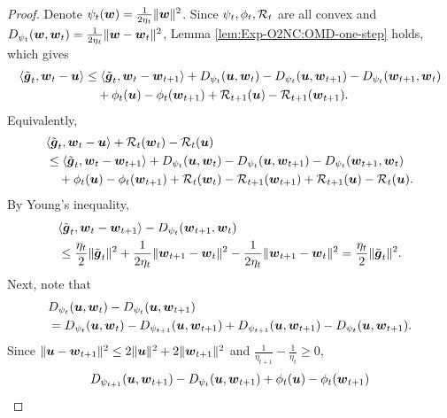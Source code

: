 \begin{proof}
Denote $\psi_t({\boldsymbol{w}})=\frac{1}{2\eta_t}\|{\boldsymbol{w}}\|^2$. Since $\psi_t,\phi_t,{\cal R}_t$ are all convex and $D_{\psi_t}({\boldsymbol{w}},{\boldsymbol{w}}_t) = \frac{1}{2\eta_t}\|{\boldsymbol{w}}-{\boldsymbol{w}}_t\|^2$, Lemma \ref{lem:Exp-O2NC:OMD-one-step} holds, which gives
\begin{align*}
    \langle \tilde{{\boldsymbol{g}}}_t, {\boldsymbol{w}}_t-{\boldsymbol{u}}\rangle 
    &\le \langle \tilde{{\boldsymbol{g}}}_t,{\boldsymbol{w}}_t - {\boldsymbol{w}}_{t+1}\rangle + D_{\psi_t}({\boldsymbol{u}},{\boldsymbol{w}}_t) - D_{\psi_t}({\boldsymbol{u}},{\boldsymbol{w}}_{t+1}) - D_{\psi_t}({\boldsymbol{w}}_{t+1},{\boldsymbol{w}}_t) \\
    &\quad + \phi_t({\boldsymbol{u}}) - \phi_t({\boldsymbol{w}}_{t+1}) + {\cal R}_{t+1}({\boldsymbol{u}}) - {\cal R}_{t+1}({\boldsymbol{w}}_{t+1}).
\end{align*}
Equivalently,
\begin{align}
    &\langle \tilde{{\boldsymbol{g}}}_t, {\boldsymbol{w}}_t-{\boldsymbol{u}}\rangle + {\cal R}_t({\boldsymbol{w}}_t) - {\cal R}_t({\boldsymbol{u}}) \notag\\
    &\le \langle \tilde{{\boldsymbol{g}}}_t,{\boldsymbol{w}}_t - {\boldsymbol{w}}_{t+1}\rangle + D_{\psi_t}({\boldsymbol{u}},{\boldsymbol{w}}_t) - D_{\psi_t}({\boldsymbol{u}},{\boldsymbol{w}}_{t+1}) - D_{\psi_t}({\boldsymbol{w}}_{t+1},{\boldsymbol{w}}_t) \notag\\
    &\quad + \phi_t({\boldsymbol{u}}) - \phi_t({\boldsymbol{w}}_{t+1}) + {\cal R}_t({\boldsymbol{w}}_t) - {\cal R}_{t+1}({\boldsymbol{w}}_{t+1}) + {\cal R}_{t+1}({\boldsymbol{u}}) - {\cal R}_t({\boldsymbol{u}}).
    \label{eq:Exp-O2NC:ogd-vary-1}
\end{align}
By Young's inequality,
\begin{align*}
    &\langle \tilde{{\boldsymbol{g}}}_t,{\boldsymbol{w}}_t - {\boldsymbol{w}}_{t+1}\rangle - D_{\psi_t}({\boldsymbol{w}}_{t+1},{\boldsymbol{w}}_t) \\
    &\le \frac{\eta_t}{2}\|\tilde{{\boldsymbol{g}}}_t\|^2 + \frac{1}{2\eta_t}\|{\boldsymbol{w}}_{t+1}-{\boldsymbol{w}}_t\|^2 - \frac{1}{2\eta_t}\|{\boldsymbol{w}}_{t+1}-{\boldsymbol{w}}_t\|^2 
    = \frac{\eta_t}{2}\|\tilde{{\boldsymbol{g}}}_t\|^2.
\end{align*}
Next, note that
\begin{align*}
    &D_{\psi_t}({\boldsymbol{u}},{\boldsymbol{w}}_t) - D_{\psi_t}({\boldsymbol{u}},{\boldsymbol{w}}_{t+1}) \\
    &= D_{\psi_t}({\boldsymbol{u}},{\boldsymbol{w}}_t) - D_{\psi_{t+1}}({\boldsymbol{u}},{\boldsymbol{w}}_{t+1}) + D_{\psi_{t+1}}({\boldsymbol{u}},{\boldsymbol{w}}_{t+1}) - D_{\psi_t}({\boldsymbol{u}},{\boldsymbol{w}}_{t+1}).
\end{align*}
Since $\|{\boldsymbol{u}}-{\boldsymbol{w}}_{t+1}\|^2 \le 2\|{\boldsymbol{u}}\|^2 + 2\|{\boldsymbol{w}}_{t+1}\|^2$ and $\frac{1}{\eta_{t+1}}-\frac{1}{\eta_t}\ge 0$,
\begin{align*}
    &D_{\psi_{t+1}}(\vecu,\vecw_{t+1}) - D_{\psi_t}(\vecu,\vecw_{t+1}) + \phi_t(\vecu)-\phi_t(\vecw_{t+1}) \\

\end{align*}
\end{proof}
